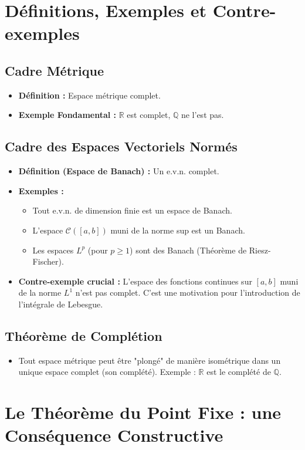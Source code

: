 \documentclass[12pt, a4paper, parskip=full]{report}
\theoremstyle{agregstyle}
\begin{document}
\section{Définitions, Exemples et Contre-exemples}
\subsection{Cadre Métrique}
\begin{itemize}
    \item \textbf{Définition :} Espace métrique complet.
    \item \textbf{Exemple Fondamental :} $\mathbb{R}$ est complet, $\mathbb{Q}$ ne l'est pas.
\end{itemize}
\subsection{Cadre des Espaces Vectoriels Normés}
\begin{itemize}
    \item \textbf{Définition (Espace de Banach) :} Un e.v.n. complet.
    \item \textbf{Exemples :}
        \begin{itemize}
            \item Tout e.v.n. de dimension finie est un espace de Banach.
            \item L'espace $\mathcal{C}([a,b])$ muni de la norme sup est un Banach.
            \item Les espaces $L^p$ (pour $p \ge 1$) sont des Banach (Théorème de Riesz-Fischer).
        \end{itemize}
    \item \textbf{Contre-exemple crucial :} L'espace des fonctions continues sur $[a,b]$ muni de la norme $L^1$ n'est pas complet. C'est une motivation pour l'introduction de l'intégrale de Lebesgue.
\end{itemize}
\subsection{Théorème de Complétion}
\begin{itemize}
    \item Tout espace métrique peut être "plongé" de manière isométrique dans un unique espace complet (son complété). Exemple : $\mathbb{R}$ est le complété de $\mathbb{Q}$.
\end{itemize}

\section{Le Théorème du Point Fixe : une Conséquence Constructive}
\end{document}

